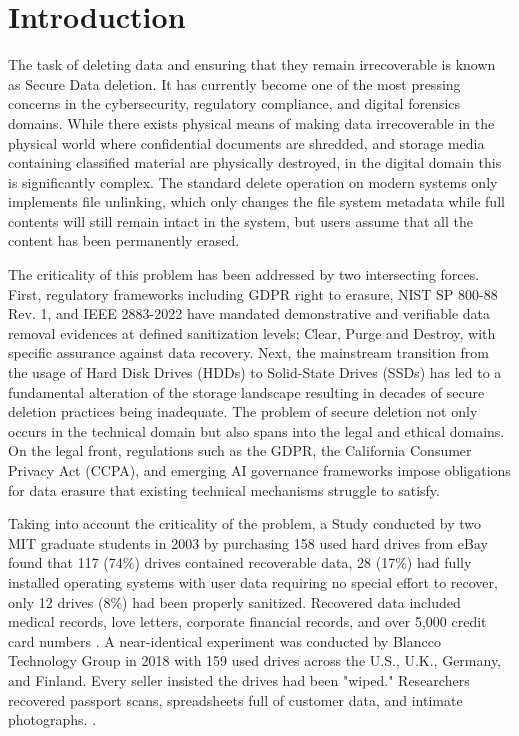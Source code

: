 \chapter{Introduction}
\label{sec:introduction}

The task of deleting data and ensuring that they remain irrecoverable is known as Secure 
Data deletion. It has currently become one of the most pressing concerns in the 
cybersecurity, regulatory compliance, and digital forensics domains. While there exists 
physical means of making data irrecoverable in the physical world where confidential 
documents are shredded, and storage media containing classified material are physically 
destroyed, in the digital domain this is significantly complex. The standard delete 
operation on modern systems only implements file unlinking, which only changes the file 
system metadata while full contents will still remain intact in the system, but users 
assume that all the content has been permanently erased. \cite{reardon2013sok}

The criticality of this problem has been addressed by two intersecting forces. First, 
regulatory frameworks including GDPR right to erasure, NIST SP 800-88 Rev. 1, and IEEE 
2883-2022 have mandated demonstrative and verifiable data removal evidences at defined 
sanitization levels; Clear, Purge and Destroy, with specific assurance against data recovery. 
Next, the mainstream transition from the usage of Hard Disk Drives (HDDs) to Solid-State 
Drives (SSDs) has led to a fundamental alteration of the storage landscape resulting in 
decades of secure deletion practices being inadequate\cite{aronsson2025secure}. The 
problem of secure deletion not only occurs in the technical domain but also spans into
the legal and ethical domains. On the legal front, regulations such as the GDPR, the 
California Consumer Privacy Act (CCPA), and emerging AI governance frameworks impose 
obligations for data erasure that existing technical mechanisms struggle to satisfy.

Taking into account the criticality of the problem, a Study conducted by two MIT graduate 
students in 2003 by purchasing 158 used hard drives from eBay found that 117 (74\%) drives 
contained recoverable data, 28 (17\%) had fully installed operating systems with user data 
requiring no special effort to recover, only 12 drives (8\%) had been properly sanitized. 
Recovered data included medical records, love letters, corporate financial records, and 
over 5,000 credit card numbers \cite{MITstudy2003}. A near-identical experiment was conducted
by Blancco Technology Group in 2018 with 159 used drives across the U.S., U.K., Germany, and 
Finland. Every seller insisted the drives had been "wiped." Researchers recovered passport 
scans, spreadsheets full of customer data, and intimate photographs. \cite{NetGuardia2026}.


